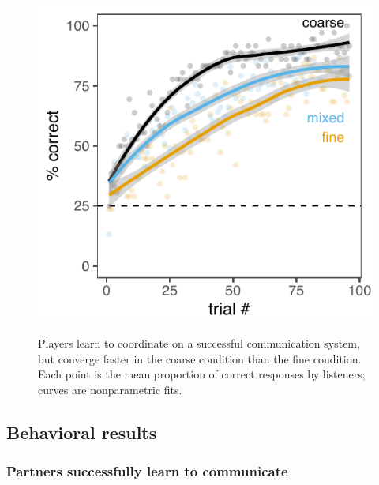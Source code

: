 \begin{figure}[t]
\begin{center}
{\includegraphics[scale=1]{./figures/sec2_empirical_accuracy.pdf}}
{\caption{{Players learn to coordinate on a successful communication system, but converge faster in the coarse condition than the fine condition. Each point is the mean proportion of correct responses by listeners; curves are nonparametric fits. 
\label{fig:context_accuracy}}}}
\vspace{-3ex}
\end{center}
\end{figure}

\subsection{Behavioral results}

\subsubsection{Partners successfully learn to communicate}

